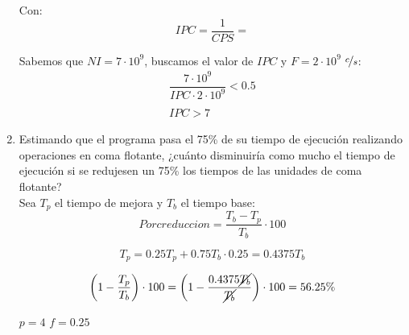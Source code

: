 \begin{ejercicio}
\begin{enumerate}
        Con:
        \begin{equation*}
            IPC = \dfrac{1}{CPS} = 
        \end{equation*}

        Sabemos que $NI = 7\cdot 10^9$, buscamos el valor de $IPC$ y $F = 2\cdot 10^9$ $\nicefrac{c}{s}$:
        \begin{gather*}
            \dfrac{7\cdot 10^9}{IPC \cdot 2\cdot 10^9} < 0.5\\
            \\
            IPC > 7
        \end{gather*}

        \item Estimando que el programa pasa el 75\% de su tiempo de ejecución realizando operaciones en coma
        flotante, ¿cuánto disminuiría como mucho el tiempo de ejecución si se redujesen un 75\% los tiempos de las
        unidades de coma flotante?\\


        Sea $T_p$ el tiempo de mejora y $T_b$ el tiempo base:
        \begin{equation*}
            Porc reduccion = \dfrac{T_b-T_p}{T_b} \cdot 100
        \end{equation*}

        \begin{equation*}
            T_p = 0.25 T_p + 0.75 T_b \cdot 0.25 = 0.4375 T_b
        \end{equation*}

        \begin{equation*}
            \left(1-\dfrac{T_p}{T_b}\right) \cdot 100 = \left(1 - \dfrac{0.4375 \cancel{T_b}}{\cancel{T_b}}\right) \cdot 100 = 56.25\%
        \end{equation*}

        $p = 4$
        $f = 0.25$

    \end{enumerate}
\end{ejercicio}


